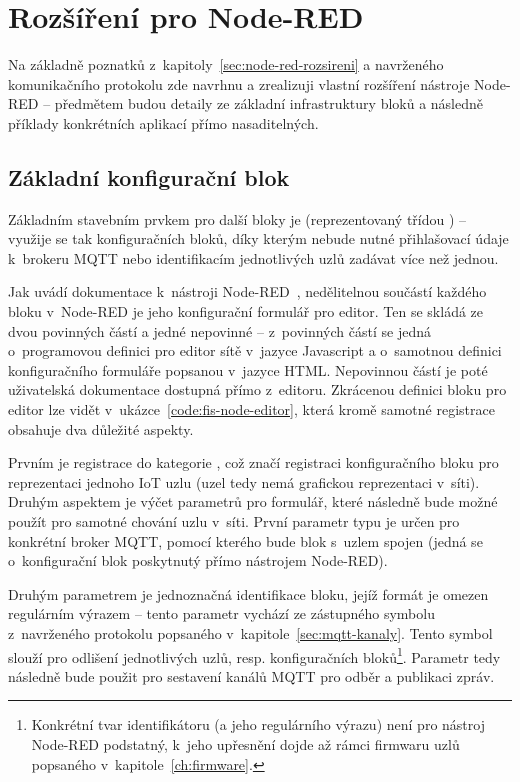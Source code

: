 \chapter{Rozšíření pro Node-RED}
\label{ch:rozsireni}

Na základně poznatků z~kapitoly~\ref{sec:node-red-rozsireni} a navrženého komunikačního protokolu zde navrhnu a
zrealizuji vlastní rozšíření nástroje Node-RED -- předmětem budou detaily ze základní infrastruktury bloků a následně
příklady konkrétních aplikací přímo nasaditelných.

\section{Základní konfigurační blok}\label{sec:zakladni-konfiguracni-blok}
Základním stavebním prvkem pro další bloky je  (reprezentovaný třídou \mbox{)} -- využije se
tak
konfiguračních bloků, díky kterým nebude nutné přihlašovací údaje k~brokeru MQTT nebo identifikacím jednotlivých
uzlů zadávat více než jednou.

Jak uvádí dokumentace k~nástroji Node-RED~\cite{NodeRedDocs}, nedělitelnou součástí každého bloku v~Node-RED je jeho
konfigurační formulář pro editor.
Ten se skládá ze dvou povinných částí a jedné nepovinné -- z~povinných částí se jedná o~programovou definici pro
editor sítě v~jazyce Javascript a o~samotnou definici konfiguračního formuláře popsanou v~jazyce HTML.
Nepovinnou částí je poté uživatelská dokumentace dostupná přímo z~editoru.
Zkrácenou definici bloku pro editor lze vidět v~ukázce~\ref{code:fis-node-editor}, která kromě samotné registrace
obsahuje dva důležité aspekty.

Prvním je registrace do kategorie , což značí registraci konfiguračního bloku pro reprezentaci jednoho
IoT uzlu (uzel tedy nemá grafickou reprezentaci v~síti).
Druhým aspektem je výčet parametrů pro formulář, které následně bude možné použít pro samotné chování uzlu v~síti.
První parametr typu  je určen pro konkrétní broker MQTT, pomocí kterého bude blok s~uzlem spojen
(jedná se o~konfigurační blok poskytnutý přímo nástrojem Node-RED).

Druhým parametrem je jednoznačná identifikace bloku, jejíž formát je omezen regulárním výrazem -- tento
parametr vychází ze zástupného symbolu  z~navrženého protokolu popsaného
v~kapitole~\ref{sec:mqtt-kanaly}.
Tento symbol slouží pro odlišení jednotlivých uzlů, resp. konfiguračních bloků\footnote{Konkrétní tvar
identifikátoru (a jeho regulárního výrazu) není pro nástroj Node-RED podstatný, k~jeho upřesnění dojde až rámci
firmwaru uzlů popsaného v~kapitole~\ref{ch:firmware}.}.
Parametr  tedy následně bude použit pro sestavení kanálů MQTT pro odběr a publikaci zpráv.

